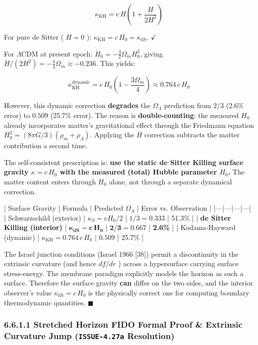 \documentclass[11pt,a4paper]{article}
\theoremstyle{definition}
\theoremstyle{remark}
\begin{document}
\begin{equation}
\kappa_{\text{KH}} = c \, H \left(1 + \frac{\dot{H}}{2H^2}\right)
\end{equation}


For pure de Sitter ( $\dot{H} = 0$ ): $\kappa_{\text{KH}} = c \, H_0 = \kappa_{\text{dS}}$. $\checkmark$

For $\Lambda$CDM at present epoch: $\dot{H}_0 = -\frac{3}{2} \Omega_m H_0^2$, giving $\dot{H}/(2H^2) = -\frac{3}{4}\Omega_m \approx -0.236$. This yields:


\begin{equation}
\kappa_{\text{KH}}^{\text{dynamic}} = c \, H_0 \left(1 - \frac{3\Omega_m}{4}\right) \approx 0.764 \, c \, H_0
\end{equation}


However, this dynamic correction \textbf{degrades} the $\Omega_\Lambda$ prediction from $2/3$ (2.6\% error) to $0.509$ (25.7\% error). The reason is \textbf{double-counting}: the measured $H_0$ already incorporates matter's gravitational effect through the Friedmann equation $H_0^2 = (8\pi G/3)(\rho_m + \rho_\Lambda)$. Applying the $\dot{H}$ correction subtracts the matter contribution a second time.

The self-consistent prescription is: \textbf{use the static de Sitter Killing surface gravity $\kappa = c \, H_0$ with the measured (total) Hubble parameter $H_0$.} The matter content enters through $H_0$ alone, not through a separate dynamical correction.

| Surface Gravity | Formula | Predicted $\Omega_\Lambda$ | Error vs. Observation |
|---|---|---|---|
| Schwarzschild (exterior) | $\kappa_S = c H_0/2$ | $1/3 = 0.333$ | 51.3\% |
| \textbf{de Sitter Killing (interior)} | $\boldsymbol{\kappa_{\text{dS}} = c \, H_0}$ | $\boldsymbol{2/3 = 0.667}$ | \textbf{2.6\%} |
| Kodama-Hayward (dynamic) | $\kappa_{\text{KH}} = 0.764 \, c \, H_0$ | $0.509$ | 25.7\% |

The Israel junction conditions (Israel 1966 [38]) permit a discontinuity in the extrinsic curvature (and hence $df/dr$ ) across a hypersurface carrying surface stress-energy. The membrane paradigm explicitly models the horizon as such a surface. Therefore the surface gravity \textbf{can} differ on the two sides, and the interior observer's value $\kappa_{\text{dS}} = c \, H_0$ is the physically correct one for computing boundary thermodynamic quantities. $\blacksquare$

\subsubsection{6.6.1.1 Stretched Horizon FIDO Formal Proof \& Extrinsic Curvature Jump (\texttt{ISSUE-4.27a} Resolution)}
\end{document}
